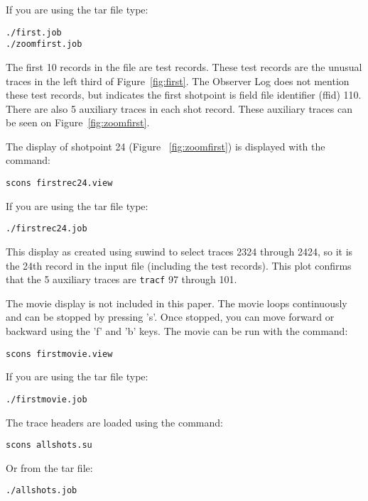 If you are using the tar file type:
\begin{verbatim}
./first.job
./zoomfirst.job
\end{verbatim}


The first 10 records in the file are test records.  These test
records are the unusual traces in the left third of
Figure~\ref{fig:first}. The Observer Log does not mention these test
records, but indicates the first shotpoint is field file identifier 
(ffid) 110.  There are also 5 auxiliary traces in each shot record.  
These auxiliary traces can be seen on Figure~\ref{fig:zoomfirst}. 

The display of shotpoint 24 (Figure ~\ref{fig:zoomfirst}) is displayed 
with the command: 
\begin{verbatim}
scons firstrec24.view
\end{verbatim}
If you are using the tar file type:
\begin{verbatim}
./firstrec24.job
\end{verbatim}

This display as created using suwind to select traces 2324 through 2424, 
so it is the 24th record in the input file (including the test records). 
This plot confirms that the 5 auxiliary traces are \texttt{tracf} 97 through 101.


The movie display is not included in this paper.  The movie loops 
continuously and can be stopped by pressing 's'.  Once stopped, you 
can move forward or backward using the 'f' and 'b' keys.  The movie can be 
run with the command:
\begin{verbatim}
scons firstmovie.view
\end{verbatim}
If you are using the tar file type:
\begin{verbatim}
./firstmovie.job
\end{verbatim}

The trace headers are loaded using the command:
\begin{verbatim}
scons allshots.su
\end{verbatim}
Or from the tar file:
\begin{verbatim}
./allshots.job
\end{verbatim}

